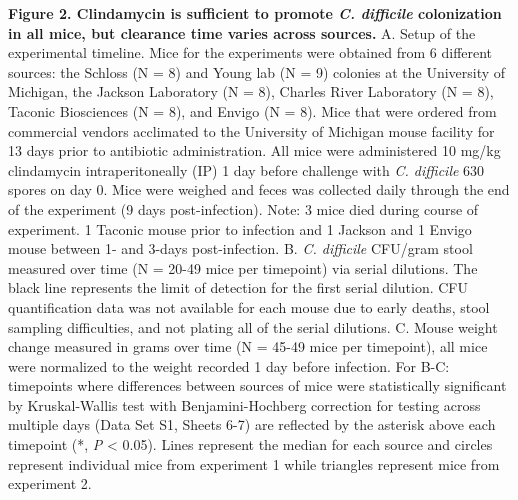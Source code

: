 \documentclass[
  11pt,
]{article}
\begin{document}
\textbf{Figure 2. Clindamycin is sufficient to promote \emph{C.
difficile} colonization in all mice, but clearance time varies across
sources.} A. Setup of the experimental timeline. Mice for the
experiments were obtained from 6 different sources: the Schloss (N = 8)
and Young lab (N = 9) colonies at the University of Michigan, the
Jackson Laboratory (N = 8), Charles River Laboratory (N = 8), Taconic
Biosciences (N = 8), and Envigo (N = 8). Mice that were ordered from
commercial vendors acclimated to the University of Michigan mouse
facility for 13 days prior to antibiotic administration. All mice were
administered 10 mg/kg clindamycin intraperitoneally (IP) 1 day before
challenge with \emph{C. difficile} 630 spores on day 0. Mice were
weighed and feces was collected daily through the end of the experiment
(9 days post-infection). Note: 3 mice died during course of experiment.
1 Taconic mouse prior to infection and 1 Jackson and 1 Envigo mouse
between 1- and 3-days post-infection. B. \emph{C. difficile} CFU/gram
stool measured over time (N = 20-49 mice per timepoint) via serial
dilutions. The black line represents the limit of detection for the
first serial dilution. CFU quantification data was not available for
each mouse due to early deaths, stool sampling difficulties, and not
plating all of the serial dilutions. C. Mouse weight change measured in
grams over time (N = 45-49 mice per timepoint), all mice were normalized
to the weight recorded 1 day before infection. For B-C: timepoints where
differences between sources of mice were statistically significant by
Kruskal-Wallis test with Benjamini-Hochberg correction for testing
across multiple days (Data Set S1, Sheets 6-7) are reflected by the
asterisk above each timepoint (*, \emph{P} \textless{} 0.05). Lines
represent the median for each source and circles represent individual
mice from experiment 1 while triangles represent mice from experiment 2.

\newpage
\end{document}
